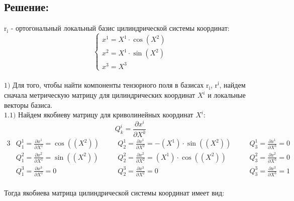 \documentclass{article}
\begin{document}
\subsection*{Решение:}
$\mathrm{r_i}$ - ортогональный локальный базис цилиндрической системы координат:\\
\[
\begin{cases}
  x^1 = X^1 \cdot \cos(X^2)\\
  x^2 = X^1 \cdot \sin(X^2)\\
  x^3 = X^3
\end{cases}
\]\\
$\mathrm{1)}$ Для того, чтобы найти компоненты тензорного поля в базисах $\mathrm{r_i}$, $\mathrm{r^i}$,
найдем сначала метрическую матрицу для цилиндрических координат $X^i$ и локальные векторы базиса.\\
$\mathrm{1.1)}$ Найдем якобиеву матрицу для криволинейных координат $X^i$:\\
\[
Q^i_k = \frac{\partial x^i}{\partial X^k}
\]
\begin{alignat*}{3}
  & Q^1_1 = \frac{\partial x^1}{\partial X^1} = \cos((X^2)) \quad &&Q^1_2 = \frac{\partial x^1}{\partial X^2} = -(X^1)\cdot \sin((X^2)) \quad &&Q^1_3 = \frac{\partial x^1}{\partial X^3} = 0 \\
  & Q^2_1 = \frac{\partial x^2}{\partial X^1} = \sin((X^2)) \quad &&Q^2_2 = \frac{\partial x^2}{\partial X^2} = (X^1)\cdot \cos((X^2)) \quad &&Q^2_3 = \frac{\partial x^2}{\partial X^3} = 0 \\
  & Q^3_1 = \frac{\partial x^3}{\partial X^1} = 0 \quad &&Q^3_2 = \frac{\partial x^3}{\partial X^2} = 0 \quad &&Q^3_3 = \frac{\partial x^3}{\partial X^3} = 1 
\end{alignat*}\\
Тогда якобиева матрица цилиндрической системы координат имеет вид:\\
\end{document}
